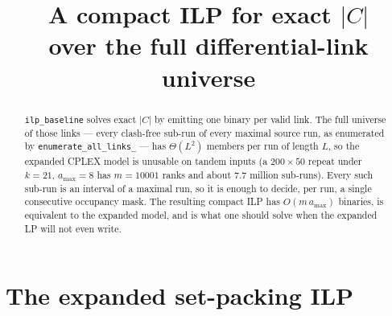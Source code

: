 \documentclass[11pt,a4paper]{article}
\title{A compact ILP for exact $|C|$\\
over the full differential-link universe}
\author{}
\date{}
\theoremstyle{definition}
\theoremstyle{plain}
\theoremstyle{remark}
\begin{document}
\maketitle

\begin{abstract}
\noindent
\texttt{ilp\_baseline} solves exact $|C|$ by emitting one binary per
valid link. The full universe of those links --- every clash-free
sub-run of every maximal source run, as enumerated by
\texttt{enumerate\_all\_links\_} --- has $\Theta(L^2)$ members per run of
length $L$, so the expanded CPLEX model is unusable on tandem inputs
(a $200\times 50$ repeat under $k{=}21$, $a_{\max}{=}8$ has $m=10001$
ranks and about $7.7$ million sub-runs). Every such sub-run is an
interval of a maximal run, so it is enough to decide, per run, a single
consecutive occupancy mask. The resulting compact ILP has
$O(m\,a_{\max})$ binaries, is equivalent to the expanded model, and is
what one should solve when the expanded LP will not even write.
\end{abstract}

\tableofcontents

\section{The expanded set-packing ILP}
\label{sec:expanded}
\end{document}
